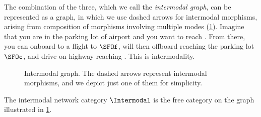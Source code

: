 \begin{example}

  The combination of the three, which we call the \emph{intermodal graph}, can be represented as a graph, in which we use dashed arrows for intermodal morphisms, arising from composition of morphisms involving multiple modes (\cref{fig:intermodal}). Imagine that you are in the parking lot of  airport and you want to reach . From there, you can onboard to a  flight to $\SFOf$, will then offboard reaching the parking lot $\SFOc$, and drive on highway  reaching . This is intermodality.

  \begin{figure}[h!]
    \begin{center}
      {}
    \end{center}
    \caption{Intermodal graph. The dashed arrows represent intermodal morphisms, and we depict just one of them for simplicity.
    }
    \label{fig:intermodal}
  \end{figure}
\end{example}

The intermodal network category $\Intermodal$ is the free category on the graph illustrated in \cref{fig:intermodal}.

